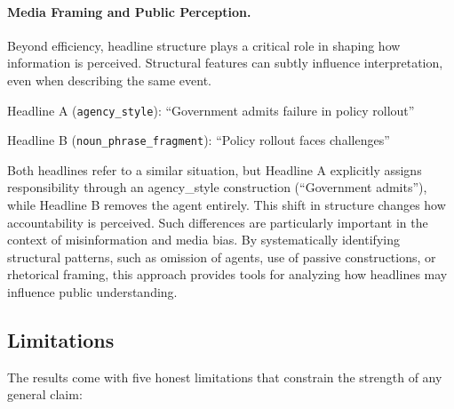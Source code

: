 \documentclass[11pt]{article}
\begin{document}
\paragraph{Media Framing and Public Perception.}
Beyond efficiency, headline structure plays a critical role in shaping how information is perceived. Structural features can subtly influence interpretation, even when describing the same event.

Headline A (\texttt{agency\_style}):
``Government admits failure in policy rollout''

Headline B (\texttt{noun\_phrase\_fragment}):
``Policy rollout faces challenges''

Both headlines refer to a similar situation, but Headline A explicitly assigns responsibility through an agency\_style construction (``Government admits''), while Headline B removes the agent entirely. This shift in structure changes how accountability is perceived.
Such differences are particularly important in the context of misinformation and media bias. By systematically identifying structural patterns, such as omission of agents, use of passive constructions, or rhetorical framing, this approach provides tools for analyzing how headlines may influence public understanding.

\subsection{Limitations}
The results come with five honest limitations that constrain the strength of any general claim:
\end{document}
